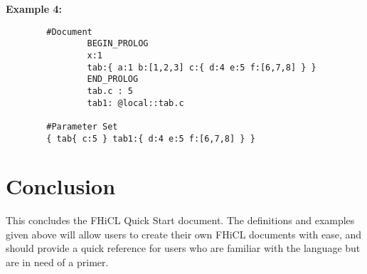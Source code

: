 \documentclass{memarticle}
\begin{document}
	\textbf{Example 4:}
	\begin{verbatim}
		#Document
                BEGIN_PROLOG
                x:1
                tab:{ a:1 b:[1,2,3] c:{ d:4 e:5 f:[6,7,8] } }
                END_PROLOG
                tab.c : 5
                tab1: @local::tab.c

		#Parameter Set
		{ tab{ c:5 } tab1:{ d:4 e:5 f:[6,7,8] } }

	\end{verbatim}
\chapter{Conclusion}
	This concludes the FHiCL Quick Start document. 
	The definitions and examples given above will allow users to create their own FHiCL documents with ease,
	and should provide a quick reference for users who are familiar with the language but are in need of a primer.
\end{document}
